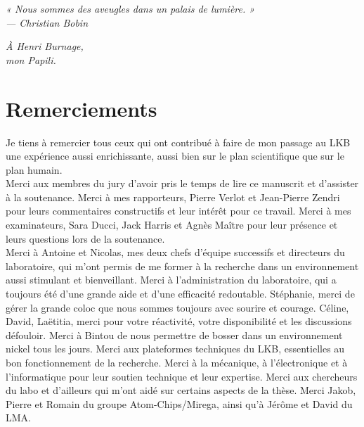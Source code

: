 


\vspace*{0.1\textheight}

\begin{flushright}
\itshape
« Nous sommes des aveugles dans un palais de lumière. »\\
— Christian Bobin
\end{flushright}

\vspace*{0.2\textheight}

\begin{flushleft}
\itshape
À Henri Burnage,\\
mon Papili.
\end{flushleft}
 
 
\newpage 
\chapter*{Remerciements}
Je tiens à remercier tous ceux qui ont contribué à faire de mon passage au LKB une expérience aussi enrichissante, aussi bien sur le plan scientifique que sur le plan humain. \\

Merci aux membres du jury d'avoir pris le temps de lire ce manuscrit et d'assister à la soutenance. Merci à mes rapporteurs, Pierre Verlot et Jean-Pierre Zendri pour leurs commentaires constructifs et leur intérêt pour ce travail. Merci à mes examinateurs, Sara Ducci, Jack Harris et Agnès Maître pour leur présence et leurs questions lors de la soutenance. \\

Merci à Antoine et Nicolas, mes deux chefs d'équipe successifs et directeurs du laboratoire, qui m'ont permis de me former à la recherche dans un environnement aussi stimulant et bienveillant. Merci à l'administration du laboratoire, qui a toujours été d'une grande aide et d'une efficacité redoutable. Stéphanie, merci de gérer la grande coloc que nous sommes toujours avec sourire et courage. Céline, David, Laëtitia, merci pour votre réactivité, votre disponibilité et les discussions défouloir. Merci à Bintou de nous permettre de bosser dans un environnement nickel tous les jours. Merci aux plateformes techniques du LKB, essentielles au bon fonctionnement de la recherche. Merci à la mécanique, à l'électronique et à l'informatique pour leur soutien technique et leur expertise. Merci aux chercheurs du labo et d'ailleurs qui m'ont aidé sur certains aspects de la thèse. Merci Jakob, Pierre et Romain du groupe Atom-Chips/Mirega, ainsi qu’à Jérôme et David du LMA. \\

